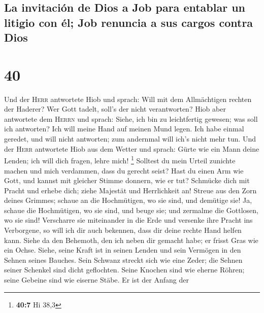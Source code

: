 \hypertarget{la-invitaciuxf3n-de-dios-a-job-para-entablar-un-litigio-con-uxe9l-job-renuncia-a-sus-cargos-contra-dios}{%
\subsection{La invitación de Dios a Job para entablar un litigio con él;
Job renuncia a sus cargos contra
Dios}\label{la-invitaciuxf3n-de-dios-a-job-para-entablar-un-litigio-con-uxe9l-job-renuncia-a-sus-cargos-contra-dios}}

\hypertarget{section-39}{%
\section{40}\label{section-39}}

 Und der \textsc{Herr} antwortete Hiob und sprach:
 Will mit dem Allmächtigen rechten der Haderer? Wer Gott
tadelt, soll's der nicht verantworten?  Hiob aber
antwortete dem \textsc{Herrn} und sprach:  Siehe, ich bin
zu leichtfertig gewesen; was soll ich antworten? Ich will meine Hand auf
meinen Mund legen.  Ich habe einmal geredet, und will
nicht antworten; zum andernmal will ich's nicht mehr tun. 
Und der \textsc{Herr} antwortete Hiob aus dem Wetter und sprach:
 Gürte wie ein Mann deine Lenden; ich will dich fragen,
lehre mich! \footnote{\textbf{40:7} Hi 38,3}  Solltest du
mein Urteil zunichte machen und mich verdammen, dass du gerecht seist?
 Hast du einen Arm wie Gott, und kannst mit gleicher
Stimme donnern, wie er tut?  Schmücke dich mit Pracht und
erhebe dich; ziehe Majestät und Herrlichkeit an!  Streue
aus den Zorn deines Grimmes; schaue an die Hochmütigen, wo sie sind, und
demütige sie!  Ja, schaue die Hochmütigen, wo sie sind,
und beuge sie; und zermalme die Gottlosen, wo sie sind! 
Verscharre sie miteinander in die Erde und versenke ihre Pracht ins
Verborgene,  so will ich dir auch bekennen, dass dir
deine rechte Hand helfen kann.  Siehe da den Behemoth,
den ich neben dir gemacht habe; er frisst Gras wie ein Ochse.
 Siehe, seine Kraft ist in seinen Lenden und sein
Vermögen in den Sehnen seines Bauches.  Sein Schwanz
streckt sich wie eine Zeder; die Sehnen seiner Schenkel sind dicht
geflochten.  Seine Knochen sind wie eherne Röhren; seine
Gebeine sind wie eiserne Stäbe.  Er ist der Anfang der
